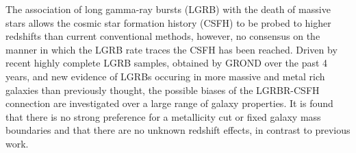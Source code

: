 


\bigskip



\bigskip

\noindent The association of long gamma-ray bursts (LGRB) with the death of massive stars allows the cosmic star formation history (CSFH) to be probed to higher redshifts than current conventional methods, however, no consensus on the manner in which the LGRB rate traces the CSFH has been reached. Driven by recent highly complete LGRB samples, obtained by GROND over the past 4 years, and new evidence of LGRBs occuring in more massive and metal rich galaxies than previously thought, the possible biases of the LGRBR-CSFH connection are investigated over a large range of galaxy properties. It is found that there is no strong preference for a metallicity cut or fixed galaxy mass boundaries and that there are no unknown redshift effects, in contrast to previous work.


